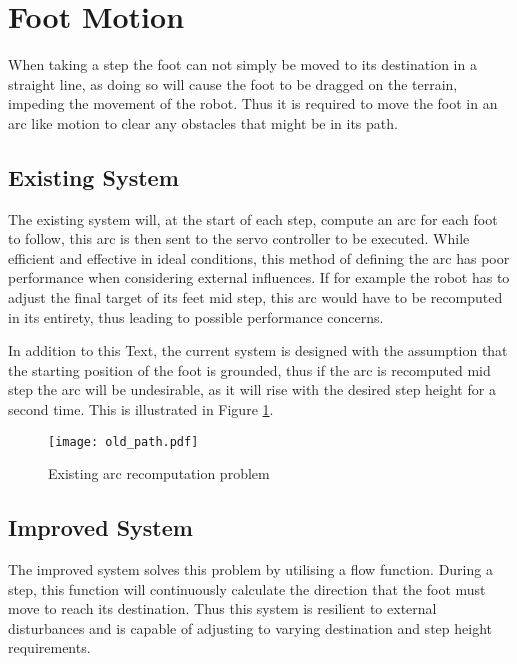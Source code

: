         \newpage
    \section{Foot Motion} \label{sec:arc_generation}
        When taking a step the foot can not simply be moved to its destination in a straight line, as doing so will cause the foot to be dragged on the terrain,
        impeding the movement of the robot. Thus it is required to move the foot in an arc like motion to clear any obstacles that might be in its path.


        \subsection{Existing System}
            The existing system will, at the start of each step, compute an arc for each foot to follow, this arc is then sent to the servo controller
            to be executed. While efficient and effective in ideal conditions, this method of defining the arc has poor performance when considering external
            influences. If for example the robot has to adjust the final target of its feet mid step, this arc would have to be recomputed in its entirety,
            thus leading to possible performance concerns.

            In addition to this Text, the current system is designed with the assumption that the starting position of the foot is grounded, thus if the arc is recomputed
            mid step the arc will be undesirable, as it will rise with the desired step height for a second time. This is illustrated in Figure \ref{fig:old_arc}.

            \begin{figure}[h]
                \centering
                \hspace{-1.38cm}
                \texttt{[image: old\_path.pdf]}
                \caption{Existing arc recomputation problem}
                \label{fig:old_arc}
            \end{figure}

        \subsection{Improved System}
            The improved system solves this problem by utilising a flow function. During a step, this function will continuously calculate the
            direction that the foot must move to reach its destination. Thus this system is resilient to external disturbances and is capable of adjusting to
            varying destination and step height requirements. 
            
